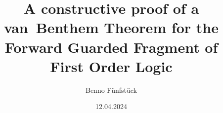 \date{12.04.2024}
\author{Benno Fünfstück}
\title{A constructive proof of a van~Benthem Theorem for the Forward Guarded Fragment of First Order Logic}
\newcommand{\supervisor}{Bartosz Bednarczyk}
\newcommand{\refereeFst}{Prof. Dr. Sebastian Rudolph}
\newcommand{\refereeSnd}{Dr.-Ing. Stefan Borgwardt}
